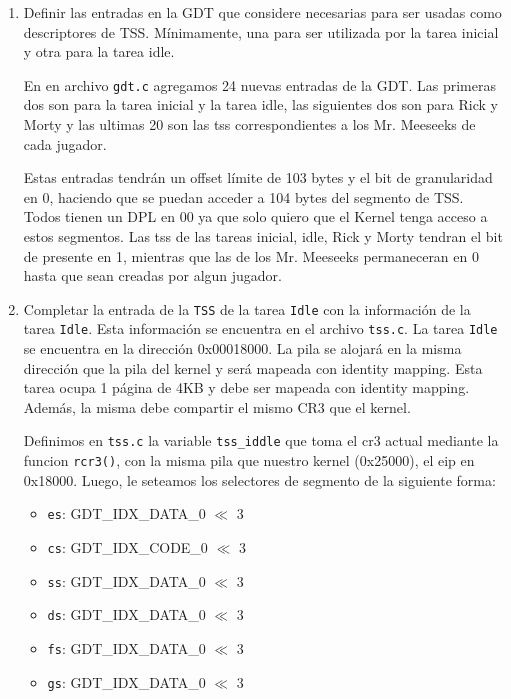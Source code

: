 \documentclass[a4paper]{article}
\begin{document}
 \begin{enumerate}[label=\alph*)]
 	\item Definir las entradas en la GDT que considere necesarias para ser usadas como  descriptores de TSS. M\'inimamente, una para ser utilizada por la tarea inicial y otra para la tarea idle.
 	
 	En en archivo \texttt{gdt.c} agregamos 24 nuevas entradas de la GDT. Las primeras dos son para la tarea inicial y la tarea idle, las siguientes dos son para Rick y Morty y las ultimas 20 son las tss correspondientes a los Mr. Meeseeks de cada jugador.
 	
 	Estas entradas tendr\'an un offset l\'imite de 103 bytes y el bit de granularidad en 0, haciendo que se puedan acceder a 104 bytes del segmento de TSS. Todos tienen un DPL en 00 ya que solo quiero que el Kernel tenga acceso a estos segmentos. Las tss de las tareas inicial, idle, Rick y Morty tendran el bit de presente en 1, mientras que las de los Mr. Meeseeks permaneceran en 0 hasta que sean creadas por algun jugador.
 	
 	\item Completar la entrada de la \texttt{TSS} de la tarea \texttt{Idle} con la información de la tarea \texttt{Idle}. Esta información se encuentra en el archivo \texttt{tss.c}. La tarea \texttt{Idle} se encuentra en la dirección	0x00018000. La pila se alojará en la misma dirección que la pila del kernel y será mapeada con identity mapping. Esta tarea ocupa 1 página de 4KB y debe ser mapeada con identity mapping. Además, la misma debe compartir el mismo CR3 que el kernel.
 	
 	Definimos en \texttt{tss.c} la variable \texttt{tss\_iddle} que toma el cr3 actual mediante la funcion \texttt{rcr3()}, con la misma pila que nuestro kernel (0x25000), el eip en 0x18000. Luego, le seteamos los selectores de segmento de la siguiente forma:
 	
 	\begin{itemize}
 		\item \texttt{es}: GDT\_IDX\_DATA\_0 $\ll$ 3
 		\item \texttt{cs}: GDT\_IDX\_CODE\_0 $\ll$ 3
 		\item \texttt{ss}: GDT\_IDX\_DATA\_0 $\ll$ 3
 		\item \texttt{ds}: GDT\_IDX\_DATA\_0 $\ll$ 3
 		\item \texttt{fs}: GDT\_IDX\_DATA\_0 $\ll$ 3
 		\item \texttt{gs}: GDT\_IDX\_DATA\_0 $\ll$ 3
 	\end{itemize}
 	 

\end{enumerate}
\end{document}

